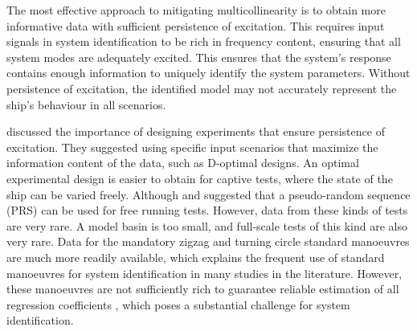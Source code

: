 The most effective approach to mitigating multicollinearity is to obtain more informative data with sufficient persistence of excitation. This requires input signals in system identification to be rich in frequency content, ensuring that all system modes are adequately excited. This ensures that the system's response contains enough information to uniquely identify the system parameters. Without persistence of excitation, the identified model may not accurately represent the ship's behaviour in all scenarios.

\textcite{yoonIdentificationHydrodynamicCoefficients2003} discussed the importance of designing experiments that ensure persistence of excitation. They suggested using specific input scenarios that maximize the information content of the data, such as D-optimal designs. An optimal experimental design is easier to obtain for captive tests, where the state of the ship can be varied freely. Although \textcite{wangOptimalDesignExcitation2020} and \textcite{millerShipModelIdentification2021} suggested that a pseudo-random sequence (PRS) can be used for free running tests. However, data from these kinds of tests are very rare. A model basin is too small, and full-scale tests of this kind are also very rare. 
Data for the mandatory zigzag and turning circle standard manoeuvres \cite{imoStandardsShipManoeuvrability2002} are much more readily available, which explains the frequent use of standard manoeuvres for system identification in many studies in the literature. However, these manoeuvres are not sufficiently rich to guarantee reliable estimation of all regression coefficients \cite{sutuloAlgorithmOfflineIdentification2014}, which poses a substantial challenge for system identification.


